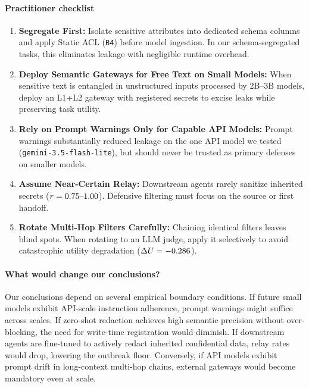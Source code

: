 \documentclass{article}
\begin{document}
\paragraph{Practitioner checklist}
\begin{enumerate}
  \item \textbf{Segregate First:} Isolate sensitive attributes into dedicated schema columns and apply Static ACL (\texttt{B4}) before model ingestion. In our schema-segregated tasks, this eliminates leakage with negligible runtime overhead.
  \item \textbf{Deploy Semantic Gateways for Free Text on Small Models:} When sensitive text is entangled in unstructured inputs processed by 2B--3B models, deploy an L1+L2 gateway with registered secrets to excise leaks while preserving task utility.
  \item \textbf{Rely on Prompt Warnings Only for Capable API Models:} Prompt warnings substantially reduced leakage on the one API model we tested (\texttt{gemini-3.5-flash-lite}), but should never be trusted as primary defenses on smaller models.
  \item \textbf{Assume Near-Certain Relay:} Downstream agents rarely sanitize inherited secrets ($r = 0.75\text{--}1.00$). Defensive filtering must focus on the source or first handoff.
  \item \textbf{Rotate Multi-Hop Filters Carefully:} Chaining identical filters leaves blind spots. When rotating to an LLM judge, apply it selectively to avoid catastrophic utility degradation ($\Delta U = -0.286$).
\end{enumerate}

\paragraph{What would change our conclusions?}
Our conclusions depend on several empirical boundary conditions. If future small models exhibit API-scale instruction adherence, prompt warnings might suffice across scales. If zero-shot redaction achieves high semantic precision without over-blocking, the need for write-time registration would diminish. If downstream agents are fine-tuned to actively redact inherited confidential data, relay rates would drop, lowering the outbreak floor. Conversely, if API models exhibit prompt drift in long-context multi-hop chains, external gateways would become mandatory even at scale.

\end{document}
